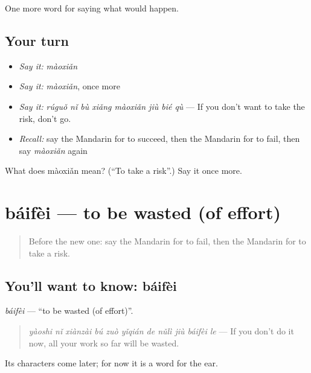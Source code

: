 \begin{grammarlens}[title={What you've built}]
One more word for saying what would happen.
\end{grammarlens}

\subsection*{Your turn}
\begin{itemize}
\raggedright
  \item \emph{Say it:} \emph{màoxiǎn}
  \item \emph{Say it:} \emph{màoxiǎn}, once more
  \item \emph{Say it:} \emph{rúguǒ nǐ bù xiǎng màoxiǎn jiù bié qù} — If you don't want to take the risk, don't go.
  \item \emph{Recall:} say the Mandarin for to succeed, then the Mandarin for to fail, then say \emph{màoxiǎn} again
\end{itemize}

\begin{tcolorbox}[breakable,colback=teal!4,colframe=teal!35!black,title={Before you move on}]
What does màoxiǎn mean? (\textquotedblleft{}To take a risk\textquotedblright{}.) Say it once more.
\end{tcolorbox}
\section[báifèi]{báifèi — to be wasted (of effort)}

\label{lesson:ZH-C394-baifei}



\begin{quote}
Before the new one: say the Mandarin for to fail, then the Mandarin for to take a risk.
\end{quote}

\subsection*{You'll want to know: báifèi}
\emph{báifèi} — \textquotedblleft{}to be wasted (of effort)\textquotedblright{}.

\begin{quote}
\emph{yàoshi nǐ xiànzài bú zuò yǐqián de nǔlì jiù báifèi le} — If you don't do it now, all your work so far will be wasted.
\end{quote}

Its characters come later; for now it is a word for the ear.

